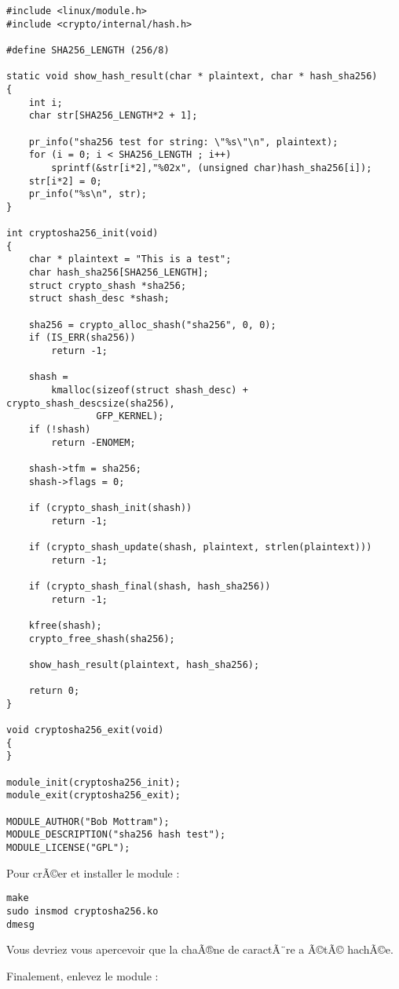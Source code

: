 \documentclass[11pt]{article}
\begin{document}
\begin{verbatim}
#include <linux/module.h>
#include <crypto/internal/hash.h>

#define SHA256_LENGTH (256/8)

static void show_hash_result(char * plaintext, char * hash_sha256)
{
    int i;
    char str[SHA256_LENGTH*2 + 1];

    pr_info("sha256 test for string: \"%s\"\n", plaintext);
    for (i = 0; i < SHA256_LENGTH ; i++)
        sprintf(&str[i*2],"%02x", (unsigned char)hash_sha256[i]);
    str[i*2] = 0;
    pr_info("%s\n", str);
}

int cryptosha256_init(void)
{
    char * plaintext = "This is a test";
    char hash_sha256[SHA256_LENGTH];
    struct crypto_shash *sha256;
    struct shash_desc *shash;

    sha256 = crypto_alloc_shash("sha256", 0, 0);
    if (IS_ERR(sha256))
        return -1;

    shash =
        kmalloc(sizeof(struct shash_desc) + crypto_shash_descsize(sha256),
                GFP_KERNEL);
    if (!shash)
        return -ENOMEM;

    shash->tfm = sha256;
    shash->flags = 0;

    if (crypto_shash_init(shash))
        return -1;

    if (crypto_shash_update(shash, plaintext, strlen(plaintext)))
        return -1;

    if (crypto_shash_final(shash, hash_sha256))
        return -1;

    kfree(shash);
    crypto_free_shash(sha256);

    show_hash_result(plaintext, hash_sha256);

    return 0;
}

void cryptosha256_exit(void)
{
}

module_init(cryptosha256_init);
module_exit(cryptosha256_exit);

MODULE_AUTHOR("Bob Mottram");
MODULE_DESCRIPTION("sha256 hash test");
MODULE_LICENSE("GPL");
\end{verbatim}

Pour crÃ©er et installer le module :

\begin{verbatim}
make
sudo insmod cryptosha256.ko
dmesg
\end{verbatim}

Vous devriez vous apercevoir que la chaÃ®ne de caractÃ¨re a Ã©tÃ© hachÃ©e.

Finalement, enlevez le module :
\end{document}
